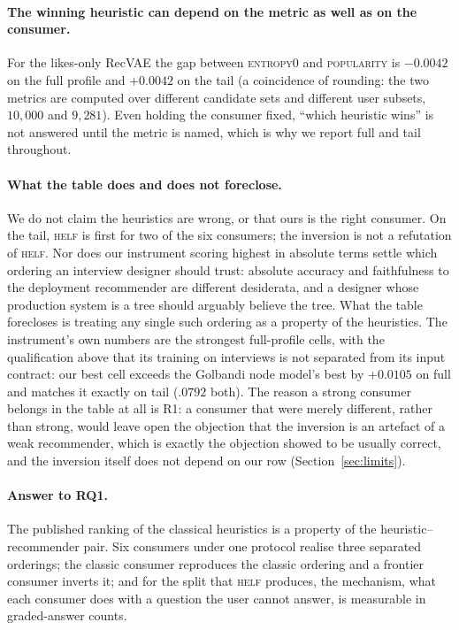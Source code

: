 \documentclass[manuscript,screen]{acmart}
\begin{document}
\paragraph{The winning heuristic can depend on the metric as well as on the consumer.} For the likes-only RecVAE the gap between \textsc{entropy0} and \textsc{popularity} is $-0.0042$ on the full profile and $+0.0042$ on the tail (a coincidence of rounding: the two metrics are computed over different candidate sets and different user subsets, $10{,}000$ and $9{,}281$). Even holding the consumer fixed, ``which heuristic wins'' is not answered until the metric is named, which is why we report full and tail throughout.

\paragraph{What the table does and does not foreclose.} We do not claim the heuristics are wrong, or that ours is the right consumer. On the tail, \textsc{helf} is first for two of the six consumers; the inversion is not a refutation of \textsc{helf}. Nor does our instrument scoring highest in absolute terms settle which ordering an interview designer should trust: absolute accuracy and faithfulness to the deployment recommender are different desiderata, and a designer whose production system is a tree should arguably believe the tree. What the table forecloses is treating any single such ordering as a property of the heuristics. The instrument's own numbers are the strongest full-profile cells, with the qualification above that its training on interviews is not separated from its input contract: our best cell exceeds the Golbandi node model's best by $+0.0105$ on full and matches it exactly on tail ($.0792$ both). The reason a strong consumer belongs in the table at all is R1: a consumer that were merely different, rather than strong, would leave open the objection that the inversion is an artefact of a weak recommender, which is exactly the objection \citet{dacrema2019progress} showed to be usually correct, and the inversion itself does not depend on our row (Section~\ref{sec:limits}).

\paragraph{Answer to RQ1.} The published ranking of the classical heuristics is a property of the heuristic--recommender pair. Six consumers under one protocol realise three separated orderings; the classic consumer reproduces the classic ordering and a frontier consumer inverts it; and for the split that \textsc{helf} produces, the mechanism, what each consumer does with a question the user cannot answer, is measurable in graded-answer counts.
\end{document}
